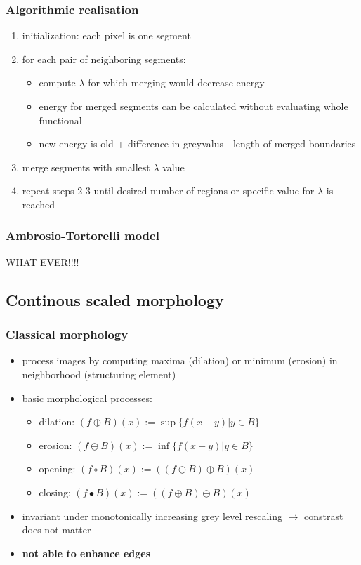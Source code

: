 \documentclass[11pt]{article}
\begin{document}
\subsubsection{Algorithmic realisation}
\label{sec-8-1-3}
\begin{enumerate}
\item initialization: each pixel is one segment
\item for each pair of neighboring segments: 
\begin{itemize}
\item compute $\lambda$ for which merging would decrease energy
\item energy for merged segments can be calculated without evaluating whole functional
\item new energy is old + difference in greyvalus - length of merged boundaries
\end{itemize}
\item merge segments with smallest $\lambda$ value
\item repeat steps 2-3 until desired number of regions or specific value for $\lambda$ is reached
\end{enumerate}
\subsubsection{Ambrosio-Tortorelli model}
\label{sec-8-1-4}
WHAT EVER!!!!

\subsection{Continous scaled morphology}
\label{sec-8-2}
\subsubsection{Classical morphology}
\label{sec-8-2-1}
\begin{itemize}
\item process images by computing maxima (dilation) or minimum (erosion) in neighborhood
(structuring element)
\item basic morphological processes:
\begin{itemize}
\item dilation: $(f\oplus B)(x):= \sup \{f(x-y)|y \in B\}$
\item erosion: $(f\ominus B)(x):= \inf \{f(x+y)|y \in B\}$
\item opening: $(f\circ B)(x):= ((f\ominus B)\oplus B)(x)$
\item closing: $(f\bullet B)(x):= ((f\oplus B)\ominus B)(x)$
\end{itemize}
\item invariant under monotonically increasing grey level rescaling $\rightarrow$ constrast
does not matter
\item \textbf{not able to enhance edges}
\end{itemize}
\end{document}
